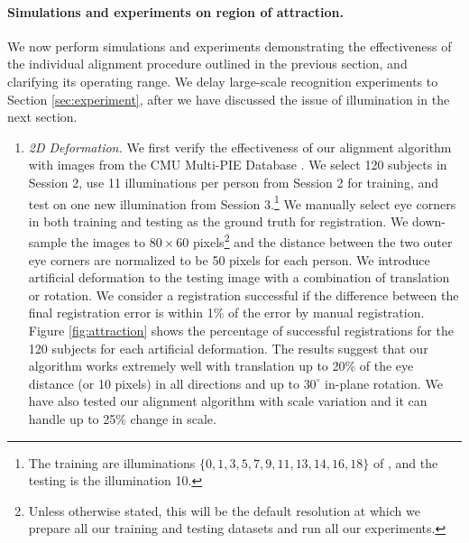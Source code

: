 \documentclass[10pt,twocolumn,letterpaper]{article}
\begin{document}
\paragraph{Simulations and experiments on region of attraction.} We now perform simulations and experiments demonstrating the effectiveness of the individual alignment procedure outlined in the previous section, and clarifying its operating range. We delay large-scale recognition experiments to Section \ref{sec:experiment}, after we have discussed the issue of illumination in the next section.\vspace{-2mm}
\begin{enumerate}	
\item{\em 2D Deformation.}  We first verify the effectiveness of our alignment algorithm with images from the CMU Multi-PIE Database \cite{Gross2008-FGR}. We select 120 subjects in Session 2, use 11 illuminations per person from Session 2 for training, and test on one new illumination from Session 3.\footnote{The training are illuminations $\{0, 1,3,5,7,9,11,13,14,16,18\}$ of \cite{Gross2008-FGR}, and the testing is the illumination 10. } We manually select eye corners in both training and testing as the ground truth for registration. We down-sample the images to $80\times 60$ pixels\footnote{Unless otherwise stated, this will be the default resolution at which we prepare all our training and testing datasets and run all our experiments.} and the distance between the two outer eye corners are normalized to be 50 pixels for each person. We introduce artificial deformation to the testing image with a combination of translation or rotation. We consider a registration successful if the difference between the final registration error is within 1\% of the error by manual registration.  Figure \ref{fig:attraction} shows the percentage of successful registrations for the 120 subjects for each artificial deformation. The results suggest that our algorithm works extremely well with translation up to 20\% of the eye distance (or 10 pixels) in all directions and up to $30^\circ$ in-plane rotation. We have also tested our alignment algorithm with scale variation and it can handle up to 25\% change in scale.


\end{enumerate}
\end{document}
